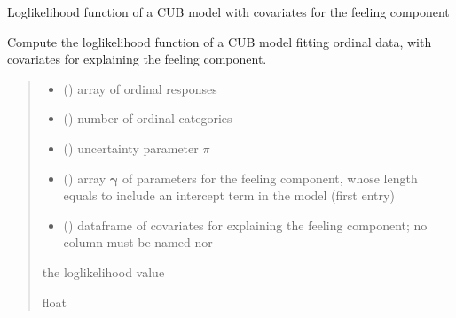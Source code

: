 \documentclass[letterpaper,10pt,english]{sphinxmanual}
\begin{document}
\begin{fulllineitems}
\label{\detokenize{cubmods:cubmods.cub_0w.loglik}}
\pysigstartsignatures
{}
\pysigstopsignatures
\sphinxAtStartPar
Log\sphinxhyphen{}likelihood function of a CUB model with covariates for the feeling component

\sphinxAtStartPar
Compute the log\sphinxhyphen{}likelihood function of a CUB model fitting ordinal data, with
covariates for explaining the feeling component.
\begin{quote}\begin{description}
\begin{itemize}
\item {} 
\sphinxAtStartPar
{} () \textendash{} array of ordinal responses

\item {} 
\sphinxAtStartPar
{} () \textendash{} number of ordinal categories

\item {} 
\sphinxAtStartPar
{} () \textendash{} uncertainty parameter \(\pi\)

\item {} 
\sphinxAtStartPar
{} () \textendash{} array \(\pmb \gamma\) of parameters for the feeling component, whose length equals 
 to include an intercept term in the model (first entry)

\item {} 
\sphinxAtStartPar
{} () \textendash{} dataframe of covariates for explaining the feeling component;
no column must be named  nor 

\end{itemize}

\sphinxAtStartPar
the log\sphinxhyphen{}likelihood value

\sphinxAtStartPar
float

\end{description}\end{quote}

\end{fulllineitems}
\end{document}
